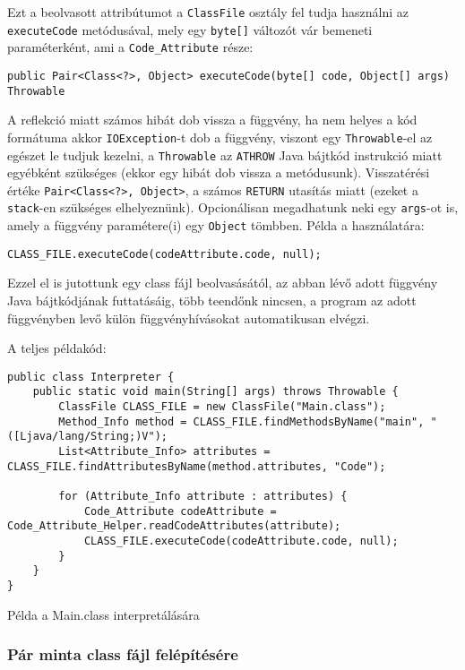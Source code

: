 Ezt a beolvasott attribútumot a \lstinline{ClassFile} osztály fel tudja használni az \lstinline{executeCode} metódusával, mely egy \lstinline{byte[]} változót vár bemeneti paraméterként, ami a \lstinline{Code_Attribute} része:
\begin{verbatim}
public Pair<Class<?>, Object> executeCode(byte[] code, Object[] args) Throwable
\end{verbatim}
A reflekció miatt számos hibát dob vissza a függvény, ha nem helyes a kód formátuma akkor \lstinline{IOException}-t dob a függvény, viszont egy \lstinline{Throwable}-el az egészet le tudjuk kezelni, a \lstinline{Throwable} az \lstinline{ATHROW} Java bájtkód instrukció miatt egyébként szükséges (ekkor egy hibát dob vissza a metódusunk).
Visszatérési értéke \lstinline{Pair<Class<?>, Object>}, a számos \lstinline{RETURN} utasítás miatt (ezeket a \lstinline{stack}-en szükséges elhelyeznünk).
Opcionálisan megadhatunk neki egy \lstinline{args}-ot is, amely a függvény paramétere(i) egy \lstinline{Object} tömbben.
Példa a használatára:
\begin{verbatim}
CLASS_FILE.executeCode(codeAttribute.code, null);
\end{verbatim}

Ezzel el is jutottunk egy class fájl beolvasásától, az abban lévő adott függvény Java bájtkódjának futtatásáig, több teendőnk nincsen, a program az adott függvényben levő külön függvényhívásokat automatikusan elvégzi.

\begin{listing}[H]
A teljes példakód:
\begin{verbatim}
public class Interpreter {
	public static void main(String[] args) throws Throwable {
		ClassFile CLASS_FILE = new ClassFile("Main.class");
		Method_Info method = CLASS_FILE.findMethodsByName("main", "([Ljava/lang/String;)V");
		List<Attribute_Info> attributes = CLASS_FILE.findAttributesByName(method.attributes, "Code");

		for (Attribute_Info attribute : attributes) {
			Code_Attribute codeAttribute = Code_Attribute_Helper.readCodeAttributes(attribute);
			CLASS_FILE.executeCode(codeAttribute.code, null);
		}
	}
}
\end{verbatim}
\caption{Példa a Main.class interpretálására}
\end{listing}

\subsubsection{Pár minta class fájl felépítésére}

